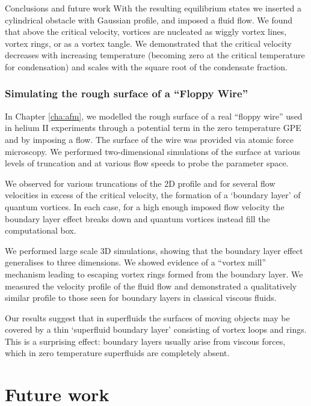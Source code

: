\begin{chapter}{\label{cha:conc}Conclusions and future work}
With the resulting equilibrium states we inserted a cylindrical obstacle with Gaussian profile, and imposed a fluid flow.  We found that above the critical velocity, vortices are nucleated as wiggly vortex lines, vortex rings, or as a vortex tangle. We demonstrated that the critical velocity decreases with increasing temperature (becoming zero at the critical temperature for condensation) and scales with the square root of the condensate fraction.

\subsubsection{Simulating the rough surface of a ``Floppy Wire''}
In Chapter \ref{cha:afm}, we modelled the rough surface of a real ``floppy wire'' used in helium II experiments through a potential term in the zero temperature GPE and by imposing a flow. The surface of the wire was provided via atomic force microscopy. We performed two-dimensional simulations of the surface at various levels of truncation and at various flow speeds to probe the parameter space.

We observed for various truncations of the 2D profile and for several flow velocities in excess of the critical velocity, the formation of a `boundary layer' of quantum vortices. In each case, for a high enough imposed flow velocity the boundary layer effect breaks down and quantum vortices instead fill the computational box.

We performed large scale 3D simulations, showing that the boundary layer effect generalises to three dimensions. We showed evidence of a ``vortex mill'' mechanism leading to escaping vortex rings formed from the boundary layer. We measured the velocity profile of the fluid flow and demonstrated a qualitatively similar profile to those seen for boundary layers in classical viscous fluids.

Our results suggest that in superfluids the surfaces of moving objects may be covered by a thin `superfluid boundary layer' consisting of vortex loops and rings. This is a surprising effect: boundary layers usually arise from viscous forces, which in zero temperature superfluids are completely absent.

\section{Future work} 

\end{chapter}
